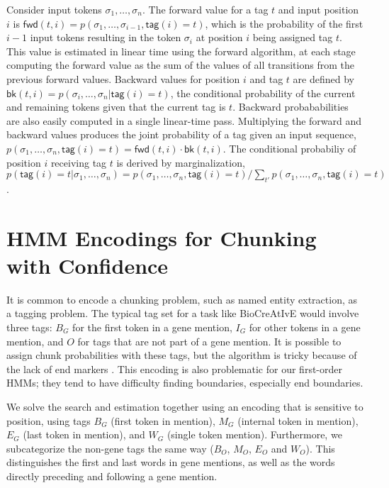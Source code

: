 \documentclass[twoside,11pt]{article}
\begin{document}
Consider input tokens $\sigma_1, \ldots, \sigma_n$.
The forward value for a tag $t$ and input position
$i$ is $\mathsf{fwd}(t,i) =
p(\sigma_1,\ldots,\sigma_{i-1},\mathsf{tag}(i) = t)$, which is the
probability of the first $i-1$ input tokens resulting in the token
$\sigma_i$ at position $i$ being assigned tag $t$.  This value is
estimated in linear time using the forward algorithm, at each stage
computing the forward value as the sum of the values of all
transitions from the previous forward values.  Backward values for
position $i$ and tag $t$ are defined by $\mathsf{bk}(t,i) =
p(\sigma_i,\ldots,\sigma_n|\mathsf{tag}(i)=t)$, the conditional
probability of the current and remaining tokens given that the current
tag is $t$.  Backward probababilities are also easily computed in a
single linear-time pass.  Multiplying the
forward and backward values produces the joint probability of a tag
given an input sequence,
$p(\sigma_1,\ldots,\sigma_n,\mathsf{tag}(i)=t) = \mathsf{fwd}(t,i) \cdot \mathsf{bk}(t,i)$.  The conditional
probabiliy of position $i$ receiving tag $t$ is derived by
marginalization,
$p(\mathsf{tag}(i)=t | \sigma_1,\ldots,\sigma_n) =
p(\sigma_1,\ldots,\sigma_n,\mathsf{tag}(i) = t) / \sum_{t'}
p(\sigma_1,\ldots,\sigma_n,\mathsf{tag}(i) = t)$.



\section{HMM Encodings for Chunking with Confidence}

It is common to encode a chunking problem, such as named entity
extraction, as a tagging problem.  The typical tag set for a task like
BioCreAtIvE would involve three tags: $B_G$ for the first token in a
gene mention, $I_G$ for other tokens in a gene mention, and $O$ for
tags that are not part of a gene mention.  It is possible to assign
chunk probabilities with these tags, but the algorithm is tricky
because of the lack of end markers \cite{culotta-mccallum}. This
encoding is also problematic for our first-order HMMs; they tend
to have difficulty finding boundaries, especially end boundaries.

We solve the search and estimation together using an encoding that is
sensitive to position, using tags $B_G$ (first token in mention),
$M_G$ (internal token in mention), $E_G$ (last token in mention), and
$W_G$ (single token mention).  Furthermore, we subcategorize the
non-gene tags the same way ($B_O$, $M_O$, $E_O$ and $W_O$).  This
distinguishes the first and last words in gene mentions, as well as
the words directly preceding and following a gene mention.
\end{document}
